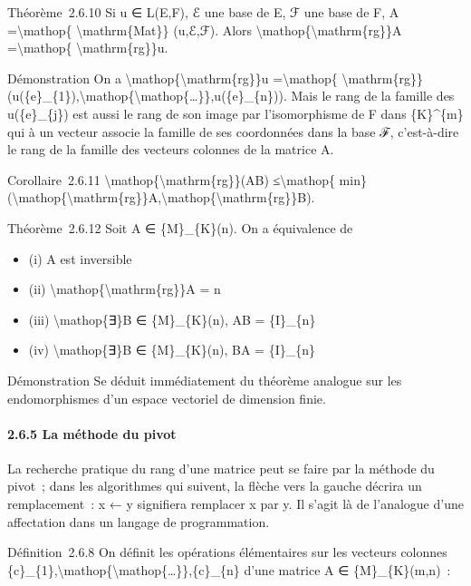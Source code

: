 \documentclass[]{article}
\begin{document}
Théorème~2.6.10 Si u ∈ L(E,F), ℰ une base de E, ℱ une base de F, A
=\textbackslash{}mathop\{ \textbackslash{}mathrm\{Mat\}\} (u,ℰ,ℱ). Alors
\textbackslash{}mathop\{\textbackslash{}mathrm\{rg\}\}A
=\textbackslash{}mathop\{ \textbackslash{}mathrm\{rg\}\}u.

Démonstration On a
\textbackslash{}mathop\{\textbackslash{}mathrm\{rg\}\}u
=\textbackslash{}mathop\{
\textbackslash{}mathrm\{rg\}\}(u(\{e\}\_\{1\}),\textbackslash{}mathop\{\textbackslash{}mathop\{\ldots{}\}\},u(\{e\}\_\{n\})).
Mais le rang de la famille des u(\{e\}\_\{j\}) est aussi le rang de son
image par l'isomorphisme de F dans \{K\}\^{}\{m\} qui à un vecteur
associe la famille de ses coordonnées dans la base ℱ, c'est-à-dire le
rang de la famille des vecteurs colonnes de la matrice A.

Corollaire~2.6.11
\textbackslash{}mathop\{\textbackslash{}mathrm\{rg\}\}(AB)
≤\textbackslash{}mathop\{
min\}(\textbackslash{}mathop\{\textbackslash{}mathrm\{rg\}\}A,\textbackslash{}mathop\{\textbackslash{}mathrm\{rg\}\}B).

Théorème~2.6.12 Soit A ∈ \{M\}\_\{K\}(n). On a équivalence de

\begin{itemize}
\itemsep1pt\parskip0pt
\item
  (i) A est inversible
\item
  (ii) \textbackslash{}mathop\{\textbackslash{}mathrm\{rg\}\}A = n
\item
  (iii) \textbackslash{}mathop\{∃\}B ∈ \{M\}\_\{K\}(n), AB =
  \{I\}\_\{n\}
\item
  (iv) \textbackslash{}mathop\{∃\}B ∈ \{M\}\_\{K\}(n), BA = \{I\}\_\{n\}
\end{itemize}

Démonstration Se déduit immédiatement du théorème analogue sur les
endomorphismes d'un espace vectoriel de dimension finie.

\paragraph{2.6.5 La méthode du pivot}

La recherche pratique du rang d'une matrice peut se faire par la méthode
du pivot~; dans les algorithmes qui suivent, la flèche vers la gauche
décrira un remplacement~: x ← y signifiera remplacer x par y. Il s'agit
là de l'analogue d'une affectation dans un langage de programmation.

Définition~2.6.8 On définit les opérations élémentaires sur les vecteurs
colonnes
\{c\}\_\{1\},\textbackslash{}mathop\{\textbackslash{}mathop\{\ldots{}\}\},\{c\}\_\{n\}
d'une matrice A ∈ \{M\}\_\{K\}(m,n)~:
\end{document}
